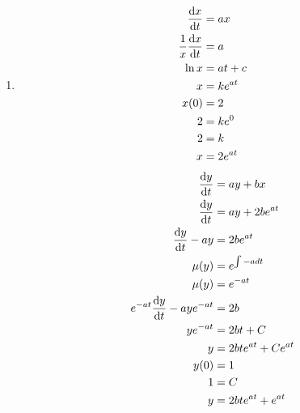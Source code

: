 \documentclass[10pt,\jkfside,a4paper]{article}
\begin{document}
\begin{enumerate}
\begin{enumerate}
\item
\begin{equation}
\begin{split}
\dv{x}{t} &= ax\\
\frac{1}{x}\dv{x}{t} &= a\\
\ln x &= at + c\\
x &= ke^{at}\\
x(0) &= 2\\
2 &= ke^0\\
2 &= k\\
x &= 2e^{at}\\
\end{split}
\end{equation}
\begin{equation}
\begin{split}
\dv{y}{t} &= ay + bx\\
\dv{y}{t} &= ay + 2be^{at}\\
\dv{y}{t} - ay &= 2be^{at}\\
\mu(y) &= e^{\int -a dt}\\
\mu(y) &= e^{-at}\\
e^{-at}\dv{y}{t} - aye^{-at} &= 2b\\
ye^{-at} &= 2bt + C\\
y &= 2bte^{at} + Ce^{at}\\
y(0) &= 1\\
1 &= C\\
y &= 2bte^{at} + e^{at}\\
\end{split}
\end{equation}


\end{enumerate}
\end{enumerate}
\end{document}
